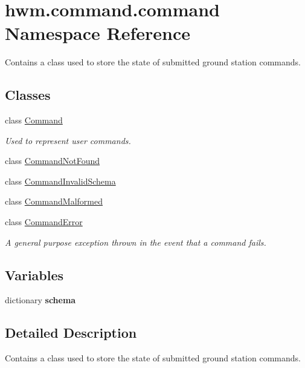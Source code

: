 \hypertarget{namespacehwm_1_1command_1_1command}{\section{hwm.\-command.\-command Namespace Reference}
\label{namespacehwm_1_1command_1_1command}
}


Contains a class used to store the state of submitted ground station commands.  


\subsection*{Classes}
\begin{DoxyCompactItemize}
\item 
class \hyperlink{classhwm_1_1command_1_1command_1_1_command}{Command}
\begin{DoxyCompactList}\small\item\em Used to represent user commands. \end{DoxyCompactList}\item 
class \hyperlink{classhwm_1_1command_1_1command_1_1_command_not_found}{Command\-Not\-Found}
\item 
class \hyperlink{classhwm_1_1command_1_1command_1_1_command_invalid_schema}{Command\-Invalid\-Schema}
\item 
class \hyperlink{classhwm_1_1command_1_1command_1_1_command_malformed}{Command\-Malformed}
\item 
class \hyperlink{classhwm_1_1command_1_1command_1_1_command_error}{Command\-Error}
\begin{DoxyCompactList}\small\item\em A general purpose exception thrown in the event that a command fails. \end{DoxyCompactList}\end{DoxyCompactItemize}
\subsection*{Variables}
\begin{DoxyCompactItemize}
\item 
dictionary {\bfseries schema}
\end{DoxyCompactItemize}


\subsection{Detailed Description}
Contains a class used to store the state of submitted ground station commands. 

